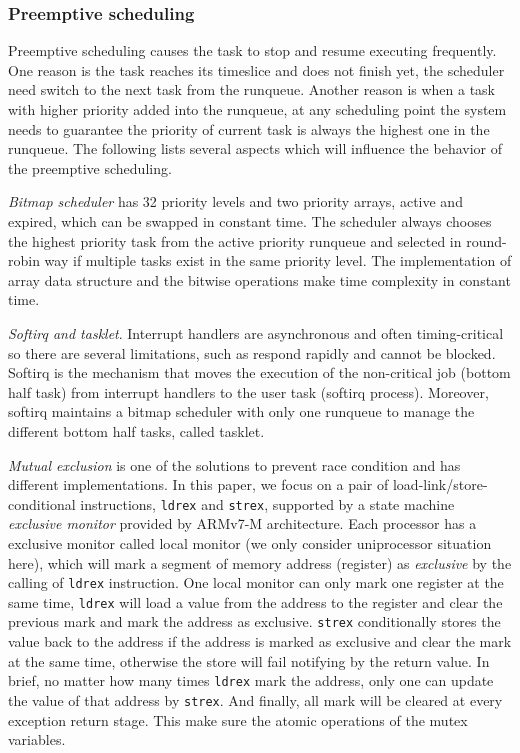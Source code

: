 \subsubsection{Preemptive scheduling}
Preemptive scheduling causes the task to stop and resume executing frequently. One reason is the task reaches its timeslice and does not finish yet, the scheduler need switch to the next task from the runqueue. Another reason is when a task with higher priority added into the runqueue, at any scheduling point the system needs to guarantee the priority of current task is always the highest one in the runqueue. The following lists several aspects which will influence the behavior of the preemptive scheduling.

\textit{Bitmap scheduler} has 32 priority levels and two priority arrays, active and expired, which can be swapped in constant time. The scheduler always chooses the highest priority task from the active priority runqueue and selected in round-robin way if multiple tasks exist in the same priority level. The implementation of array data structure and the bitwise operations make time complexity in constant time.

\textit{Softirq and tasklet}. Interrupt handlers are asynchronous and often timing-critical so there are several limitations, such as respond rapidly and cannot be blocked. Softirq is the mechanism that moves the execution of the non-critical job (bottom half task) from interrupt handlers to the user task (softirq process). Moreover, softirq maintains a bitmap scheduler with only one runqueue to manage the different bottom half tasks, called tasklet.

\textit{Mutual exclusion} is one of the solutions to prevent race condition and has different implementations. In this paper, we focus on a pair of load-link/store-conditional instructions, \texttt{ldrex} and \texttt{strex}, supported by a state machine \textit{exclusive monitor} provided by ARMv7-M architecture. Each processor has a exclusive monitor called local monitor (we only consider uniprocessor situation here), which will mark a segment of memory address (register) as \textit{exclusive} by the calling of \texttt{ldrex} instruction. One local monitor can only mark one register at the same time, \texttt{ldrex} will load a value from the address to the register and clear the previous mark and mark the address as exclusive. \texttt{strex} conditionally stores the value back to the address if the address is marked as exclusive and clear the mark at the same time, otherwise the store will fail notifying by the return value. In brief, no matter how many times \texttt{ldrex} mark the address, only one can update the value of that address by \texttt{strex}. And finally, all mark will be cleared at every exception return stage. This make sure the atomic operations of the mutex variables.

